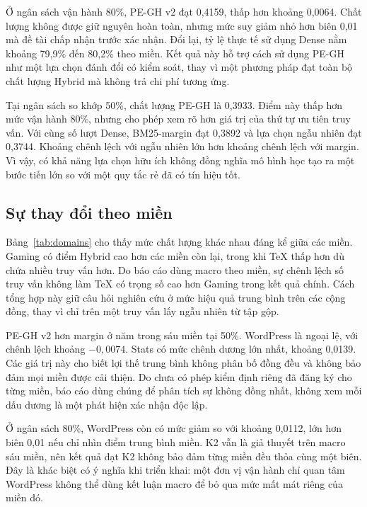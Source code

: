 Ở ngân sách vận hành 80\%, PE-GH v2 đạt 0,4159, thấp hơn \Hstar{} khoảng 0,0064. Chất lượng không được giữ nguyên hoàn toàn, nhưng mức suy giảm nhỏ hơn biên 0,01 mà đề tài chấp nhận trước xác nhận. Đổi lại, tỷ lệ thực tế sử dụng Dense nằm khoảng 79,9\% đến 80,2\% theo miền. Kết quả này hỗ trợ cách sử dụng PE-GH như một lựa chọn đánh đổi có kiểm soát, thay vì một phương pháp đạt toàn bộ chất lượng Hybrid mà không trả chi phí tương ứng.

Tại ngân sách so khớp 50\%, chất lượng PE-GH là 0,3933. Điểm này thấp hơn mức vận hành 80\%, nhưng cho phép xem rõ hơn giá trị của thứ tự ưu tiên truy vấn. Với cùng số lượt Dense, BM25-margin đạt 0,3892 và lựa chọn ngẫu nhiên đạt 0,3744. Khoảng chênh lệch với ngẫu nhiên lớn hơn khoảng chênh lệch với margin. Vì vậy, có khả năng lựa chọn hữu ích không đồng nghĩa mô hình học tạo ra một bước tiến lớn so với một quy tắc rẻ đã có tín hiệu tốt.

\subsection{Sự thay đổi theo miền}
\begin{table}[htbp]
\centering\small
\caption{Chất lượng theo miền và chênh lệch giữa PE-GH v2 với margin ở cùng ngân sách 50\%. Các giá trị là mô tả, chưa phải kiểm định riêng cho từng miền.}
\label{tab:domains}

\end{table}

Bảng~\ref{tab:domains} cho thấy mức chất lượng khác nhau đáng kể giữa các miền. Gaming có điểm Hybrid cao hơn các miền còn lại, trong khi TeX thấp hơn dù chứa nhiều truy vấn hơn. Do báo cáo dùng macro theo miền, sự chênh lệch số truy vấn không làm TeX có trọng số cao hơn Gaming trong kết quả chính. Cách tổng hợp này giữ câu hỏi nghiên cứu ở mức hiệu quả trung bình trên các cộng đồng, thay vì chỉ trên một truy vấn lấy ngẫu nhiên từ tập gộp.

PE-GH v2 hơn margin ở năm trong sáu miền tại 50\%. WordPress là ngoại lệ, với chênh lệch khoảng $-0{,}0074$. Stats có mức chênh dương lớn nhất, khoảng 0,0139. Các giá trị này cho biết lợi thế trung bình không phân bố đồng đều và không bảo đảm mọi miền được cải thiện. Do chưa có phép kiểm định riêng đã đăng ký cho từng miền, báo cáo dùng chúng để phân tích sự không đồng nhất, không xem mỗi dấu dương là một phát hiện xác nhận độc lập.

Ở ngân sách 80\%, WordPress còn có mức giảm so với \Hstar{} khoảng 0,0112, lớn hơn biên 0,01 nếu chỉ nhìn điểm trung bình miền. K2 vẫn là giả thuyết trên macro sáu miền, nên kết quả đạt K2 không bảo đảm từng miền đều thỏa cùng một biên. Đây là khác biệt có ý nghĩa khi triển khai: một đơn vị vận hành chỉ quan tâm WordPress không thể dùng kết luận macro để bỏ qua mức mất mát riêng của miền đó.

